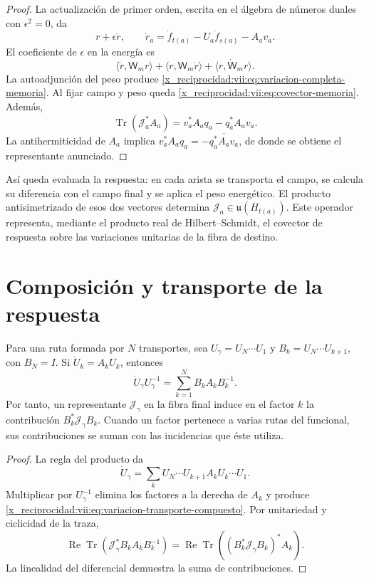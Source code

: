 \begin{proof}
La actualización de primer orden, escrita en el álgebra de números
duales con \(\epsilon^2=0\), da
\[
 r+\epsilon\dot r,\qquad
 \dot r_a=\dot f_{t(a)}-U_a\dot f_{s(a)}-A_av_a.
\]
El coeficiente de \(\epsilon\) en la energía es
\[
 \langle\dot r,\mathsf W_mr\rangle+
 \langle r,\mathsf W_m\dot r\rangle+
 \langle r,\dot{\mathsf W}_mr\rangle.
\]
La autoadjunción del peso produce
\eqref{x_reciprocidad:vii:eq:variacion-completa-memoria}. Al fijar campo y peso queda
\eqref{x_reciprocidad:vii:eq:covector-memoria}. Además,
\[
 \operatorname{Tr}(\mathcal J_a^*A_a)
 =v_a^*A_aq_a-q_a^*A_av_a.
\]
La antihermiticidad de \(A_a\) implica
\(v_a^*A_aq_a=-\overline{q_a^*A_av_a}\), de donde se obtiene
el representante anunciado.
\end{proof}

Así queda evaluada la respuesta: en cada arista se transporta el campo,
se calcula su diferencia con el campo final y se aplica el peso energético.
El producto antisimetrizado de esos dos vectores determina
\(\mathcal J_a\in\mathfrak u(H_{t(a)})\). Este operador representa,
mediante el producto real de Hilbert--Schmidt, el covector de respuesta
sobre las variaciones unitarias de la fibra de destino.

\section{Composición y transporte de la respuesta}
\label{x_reciprocidad:vii:subsec:composicion-respuesta}

\begin{proposition}
\label{x_reciprocidad:vii:prop:composicion-respuesta}
Para una ruta formada por \(N\) transportes, sea
\(U_\gamma=U_N\cdots U_1\) y
\(B_k=U_N\cdots U_{k+1}\), con \(B_N=I\).
Si \(\dot U_k=A_kU_k\), entonces
\begin{equation}
 \dot U_\gamma U_\gamma^{-1}
 =\sum_{k=1}^N B_kA_kB_k^{-1}.
 \label{x_reciprocidad:vii:eq:variacion-transporte-compuesto}
\end{equation}
Por tanto, un representante \(\mathcal J_\gamma\) en la fibra final
induce en el factor \(k\) la contribución
\(B_k^*\mathcal J_\gamma B_k\). Cuando un factor pertenece a varias
rutas del funcional, sus contribuciones se suman con las incidencias
que éste utiliza.
\end{proposition}

\begin{proof}
La regla del producto da
\[
 \dot U_\gamma=\sum_k
 U_N\cdots U_{k+1}A_kU_k\cdots U_1.
\]
Multiplicar por \(U_\gamma^{-1}\) elimina los factores a la derecha
de \(A_k\) y produce \eqref{x_reciprocidad:vii:eq:variacion-transporte-compuesto}.
Por unitariedad y ciclicidad de la traza,
\[
 \operatorname{Re}\operatorname{Tr}
   (\mathcal J_\gamma^*B_kA_kB_k^{-1})
 =\operatorname{Re}\operatorname{Tr}
   ((B_k^*\mathcal J_\gamma B_k)^*A_k).
\]
La linealidad del diferencial demuestra la suma de contribuciones.
\end{proof}

